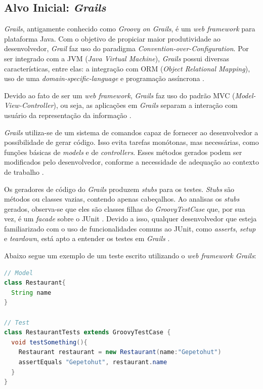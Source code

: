 \subsection{Alvo Inicial: \textit{Grails}} 
\textit{Grails}, antigamente conhecido como \textit{Groovy on Grails}, é um \textit{web framework} para plataforma Java. Com o objetivo de propiciar maior produtividade ao desenvolvedor, \textit{Grail} faz uso do paradigma \textit{Convention-over-Configuration}.  Por ser integrado com a JVM (\textit{Java Virtual Machine}), \textit{Grails} possui diversas características, entre elas: a integração com ORM (\textit{Object Relational Mapping}), uso de uma \textit{domain-specific-language} e programação assíncrona \cite{grails2015}.
\par
\indent Devido ao fato de ser um \textit{web framework}, \textit{Grails} faz uso do padrão MVC (\textit{Model-View-Controller}), ou seja, as aplicações em \textit{Grails} separam a interação com usuário da representação da informação \cite{grails2015}.
\par
\indent \textit{Grails} utiliza-se de um sistema de comandos capaz de fornecer ao desenvolvedor a possibilidade de gerar código. Isso evita tarefas monótonas, mas necessárias, como funções básicas de \textit{models} e de \textit{controllers}. Esses métodos gerados podem ser modificados pelo desenvolvedor, conforme a necessidade de adequação ao contexto de trabalho  \cite{grails2015}.
\par
\indent Os geradores de código do \textit{Grails} produzem  \textit{stubs} para os testes. \textit{Stubs} são métodos ou classes vazias, contendo apenas cabeçalhos. Ao analisas os \textit{stubs} gerados, observa-se que eles são classes filhas do \textit{GroovyTestCase} que, por sua vez, é um \textit{facade} sobre o JUnit \cite{broughton2010}. Devido a isso, qualquer desenvolvedor que esteja familiarizado com o uso de funcionalidades comuns ao JUnit, como \textit{asserts}, \textit{setup} e \textit{teardown}, está apto a entender os testes em \textit{Grails} \cite{broughton2010}.
\par
\indent Abaixo segue um exemplo de um teste escrito utilizando o \textit{web framework Grails}:

\begin{lstlisting}[language=java, label=exTesteGrails, caption={Exemplo de Teste em \textit{Grails}}]
// Model
class Restaurant{
  String name
}

// Test
class RestaurantTests extends GroovyTestCase {
  void testSomething(){
    Restaurant restaurant = new Restaurant(name:"Gepetohut")
    assertEquals "Gepetohut", restaurant.name
  }
}
\end{lstlisting}

